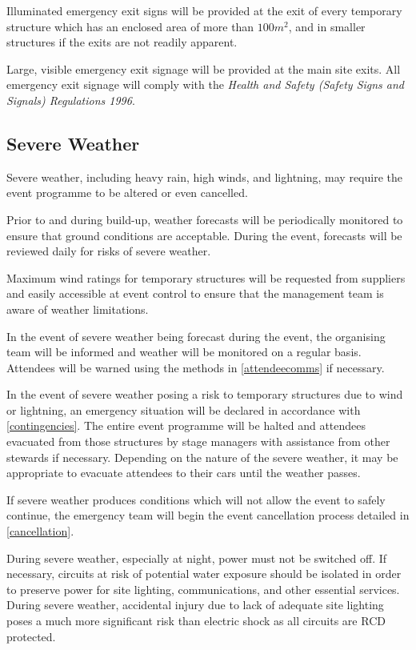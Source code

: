 Illuminated emergency exit signs will be provided at the exit of every temporary structure which
has an enclosed area of more than $100m^2$, and in smaller structures if the exits are not
readily apparent.

Large, visible emergency exit signage will be provided at the main site exits. All emergency exit
signage will comply with the \textit{Health and Safety (Safety Signs and Signals) Regulations 1996}.

\subsection{Severe Weather}
Severe weather, including heavy rain, high winds, and lightning, may require the event
programme to be altered or even cancelled.

Prior to and during build-up, weather forecasts will be periodically monitored to ensure
that ground conditions are acceptable. During the event, forecasts will be reviewed
daily for risks of severe weather.

Maximum wind ratings for temporary structures will be requested from suppliers and
easily accessible at event control to ensure that the management team is aware of weather
limitations.

In the event of severe weather being forecast during the event, the organising team will
be informed and weather will be monitored on a regular basis. Attendees will be warned
using the methods in \cref{attendeecomms} if necessary.

In the event of severe weather posing a risk to temporary structures due to wind or
lightning, an emergency situation will be declared in accordance with
\cref{contingencies}. The entire event programme will be halted and attendees
evacuated from those structures by stage managers with assistance from other stewards
if necessary. Depending on the nature of the severe weather, it may be appropriate to
evacuate attendees to their cars until the weather passes.

If severe weather produces conditions which will not allow the event to safely continue,
the emergency team will begin the event cancellation process detailed in
\cref{cancellation}.

During severe weather, especially at night, power must not be switched off. If
necessary, circuits at risk of potential water exposure should be isolated in
order to preserve power for site lighting, communications, and other essential services.
During severe weather, accidental injury due to lack of adequate site lighting poses a
much more significant risk than electric shock as all circuits are RCD protected.

